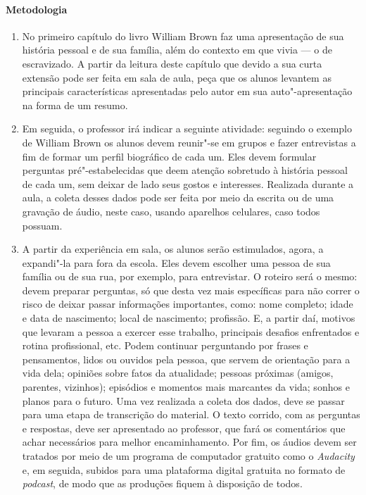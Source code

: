 \documentclass[12pt]{extarticle}
\begin{document}
 \paragraph{Metodologia}
   \begin{enumerate}
    \item
    No primeiro capítulo do livro William Brown faz uma apresentação
    de sua história pessoal e de sua família, além do contexto em que vivia --- o de escravizado. A partir da leitura deste capítulo que devido a sua curta 
    extensão pode ser feita em sala de aula, peça que os alunos levantem
    as principais características apresentadas pelo autor em sua auto"-apresentação
    na forma de um resumo.

    \item
    Em seguida, o professor irá indicar a seguinte atividade:
    seguindo o exemplo de William Brown os alunos devem
    reunir"-se em grupos e fazer entrevistas a fim de formar um
    perfil biográfico de cada um. Eles devem formular 
    perguntas pré"-estabelecidas que deem atenção sobretudo à história 
    pessoal de cada um, sem deixar de lado seus gostos e interesses. 
    Realizada durante a aula, a coleta desses dados pode ser feita por 
    meio da escrita ou de uma gravação de áudio, neste caso, usando
    aparelhos celulares, caso todos possuam.

    \item 
    A partir da experiência em sala, os alunos serão estimulados, agora,
    a expandi"-la para fora da escola. Eles devem escolher uma pessoa 
    de sua família ou de sua rua, por exemplo, para entrevistar.
    O roteiro será o mesmo: devem preparar perguntas, só que desta vez mais 
    específicas para não correr o risco de deixar passar informações importantes, como:
    nome completo; idade e data de
    nascimento; local de nascimento; profissão. E, a partir daí, motivos que
    levaram a pessoa a exercer esse trabalho, principais desafios
    enfrentados e rotina profissional, etc. Podem continuar perguntando por frases e pensamentos, lidos ou
    ouvidos pela pessoa, que servem de orientação para a vida dela; opiniões
    sobre fatos da atualidade; pessoas próximas (amigos, parentes,
    vizinhos); episódios e momentos mais marcantes da vida; sonhos e planos
    para o futuro.
    Uma vez realizada a coleta dos dados, deve se passar para uma etapa de 
    transcrição do material. O texto corrido, com as perguntas e respostas,
    deve ser apresentado ao professor, que fará os comentários que achar necessários
    para melhor encaminhamento. 
    Por fim, os áudios devem ser tratados por meio de um programa de computador
    gratuito como o \emph{Audacity} e, em seguida, subidos para uma plataforma
    digital gratuita no formato de \emph{podcast}, de modo que as produções fiquem 
    à disposição de todos.

   \end{enumerate}
\end{document}
